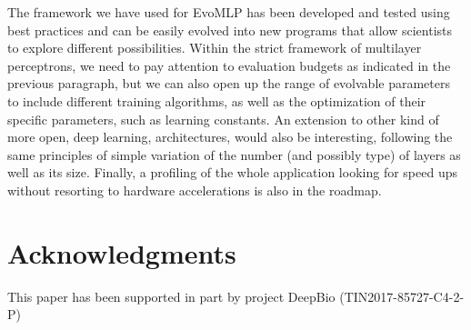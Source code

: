 \documentclass[conference]{IEEEtran}\usepackage[]{graphicx}\usepackage[]{color}
\begin{document}
The framework we have used for EvoMLP has been developed and tested using best practices and can be easily evolved into new programs that allow scientists to explore different possibilities. Within the strict framework of multilayer perceptrons, we need to pay attention to evaluation budgets as indicated in the previous paragraph, but we can also open up the range of evolvable parameters to include different training algorithms, as well as the optimization of their specific parameters, such as learning constants. An extension to other kind of more open, deep learning, architectures, would also be interesting, following the same principles of simple variation of the number (and possibly type) of layers as well as its size. Finally, a profiling of the whole application looking for speed ups without resorting to hardware accelerations is also in the roadmap.


\section*{Acknowledgments}

This paper has been supported in part by project DeepBio (TIN2017-85727-C4-2-P)



\end{document}
